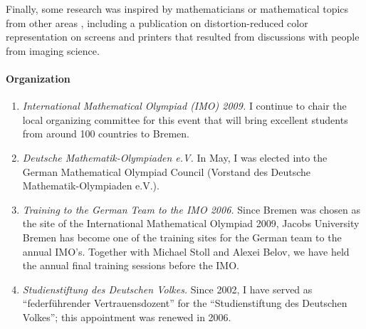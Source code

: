 Finally, some research was inspired by mathematicians or mathematical topics from other areas \cite{Conway,FracSums}, including a publication on distortion-reduced color representation on screens and printers \cite{PhilippColor} that resulted from discussions with people from imaging science.


\goodbreak

\paragraph{Organization}

\begin{enumerate}
\item {\sl International Mathematical Olympiad (IMO) 2009.}
I continue to chair the local organizing committee for this event that will bring excellent students from around 100 countries to Bremen.
\item {\sl Deutsche Mathematik-Olympiaden e.V.}
In May, I was elected into the German Mathematical Olympiad Council (Vorstand des Deut\-sche Mathematik-Olympiaden e.V.).
\item {\sl Training to the German Team to the IMO 2006.}
Since Bremen was chosen as the site of the International Mathematical Olympiad 2009, Jacobs University Bremen has  become one of the training sites for the German team to the annual IMO's. Together with Michael Stoll and Alexei Belov, we have held the annual final training sessions before the IMO.
\item {\sl Studienstiftung des Deutschen Volkes.}
Since 2002, I have served as ``federf\"uhrender Vertrauensdozent'' for the ``Studienstiftung des Deut\-schen Volkes''; this appointment was renewed in 2006.


\end{enumerate}

